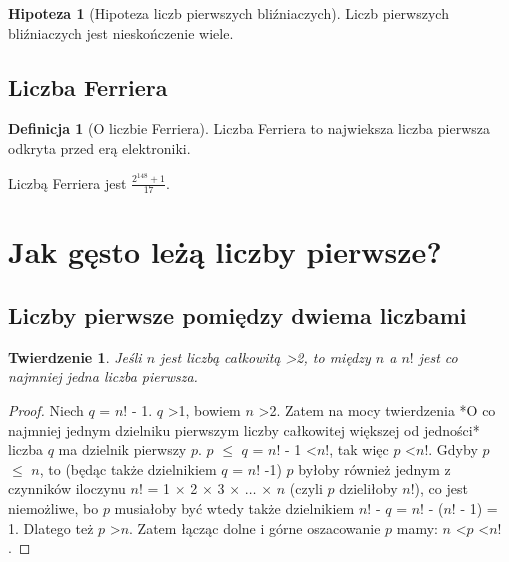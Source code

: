\documentclass[10pt,onecolumn]{article}
\newtheorem{theorem}{Twierdzenie}
\theoremstyle{definition}
\newtheorem{definition}{Definicja}
\theoremstyle{hypothesis}
\newtheorem{hypothesis}{Hipoteza}
\theoremstyle{capability}
\begin{document}
\begin{hypothesis}[Hipoteza liczb pierwszych bliźniaczych]
Liczb pierwszych bliźniaczych jest nieskończenie wiele.
\label{Twin_primes_hyp}
\end{hypothesis}

\subsection{Liczba Ferriera}

\begin{definition}[O liczbie Ferriera]
Liczba Ferriera to najwieksza liczba pierwsza odkryta przed erą elektroniki. 
\end{definition}

Liczbą Ferriera jest $\frac{2^{148} + 1}{17}$.

\newpage


\section{Jak gęsto leżą liczby pierwsze?}

\subsection{Liczby pierwsze pomiędzy dwiema liczbami}

\begin{theorem}
Jeśli $n$ jest liczbą całkowitą \textgreater 2, to między $n$ a $n!$ jest co najmniej jedna liczba pierwsza.
\end{theorem}

\begin{proof}
Niech $q$ = $n!$ - 1. $q$ \textgreater 1, bowiem $n$ \textgreater 2. Zatem na mocy twierdzenia *O co najmniej jednym dzielniku pierwszym liczby całkowitej większej od jedności* liczba $q$ ma dzielnik pierwszy $p$. $p$ $\leq$ $q$ = $n!$ - 1 \textless $n!$, tak więc $p$ \textless $n!$. Gdyby $p$ $\leq$ $n$, to (będąc także dzielnikiem $q$ = $n!$ -1) $p$ byłoby również jednym z czynników iloczynu $n!$ = 1 $\times$ 2 $\times$ 3 $\times$ $\ldots$ $\times$ $n$ (czyli $p$ dzieliłoby $n!$), co jest niemożliwe, bo $p$ musiałoby być wtedy także dzielnikiem $n!$ - $q$ = $n!$ - ($n!$ - 1) = 1. Dlatego też $p$ \textgreater $n$. Zatem łącząc dolne i górne oszacowanie $p$ mamy: $n$ \textless $p$ \textless $n!$.
\end{proof}
\end{document}
